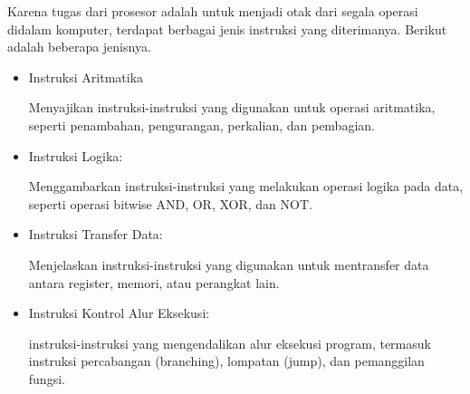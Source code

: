 Karena tugas dari prosesor adalah untuk menjadi otak dari segala operasi didalam komputer,
terdapat berbagai jenis instruksi yang diterimanya. Berikut adalah beberapa jenisnya.
\begin{itemize}

  \item Instruksi Aritmatika

    Menyajikan instruksi-instruksi yang digunakan untuk operasi aritmatika,
    seperti penambahan, pengurangan, perkalian, dan pembagian.

  \item Instruksi Logika:

    Menggambarkan instruksi-instruksi yang melakukan operasi logika pada data,
    seperti operasi bitwise AND, OR, XOR, dan NOT.

  \item Instruksi Transfer Data:

    Menjelaskan instruksi-instruksi yang digunakan untuk mentransfer data
    antara register, memori, atau perangkat lain.

  \item Instruksi Kontrol Alur Eksekusi:

    instruksi-instruksi yang mengendalikan alur eksekusi program, termasuk
    instruksi percabangan (branching), lompatan (jump), dan pemanggilan fungsi.

\end{itemize}
